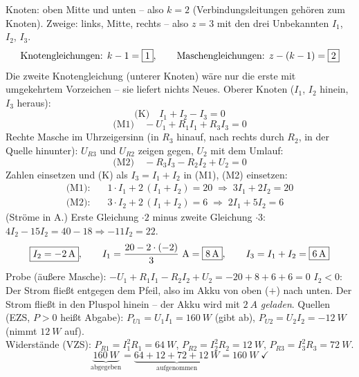 \documentclass[11pt,a4paper]{article}
\begin{document}
\begin{loesung}
Knoten: oben Mitte und unten -- also $k = 2$ (Verbindungsleitungen gehören zum Knoten). Zweige: links, Mitte, rechts -- also $z = 3$ mit den drei Unbekannten $I_1$, $I_2$, $I_3$.
\[
  \text{Knotengleichungen: } k - 1 = \ergebnis{1}, \qquad \text{Maschengleichungen: } z - (k-1) = \ergebnis{2}
\]
Die zweite Knotengleichung (unterer Knoten) wäre nur die erste mit umgekehrtem Vorzeichen -- sie liefert nichts Neues.
Oberer Knoten ($I_1$, $I_2$ hinein, $I_3$ heraus):
\[
  \text{(K)}\quad I_1 + I_2 - I_3 = 0
\]
\[
  \text{(M1)}\quad -U_1 + R_1 I_1 + R_3 I_3 = 0
\]
Rechte Masche im Uhrzeigersinn (in $R_3$ hinauf, nach rechts durch $R_2$, in der Quelle hinunter): $U_{R3}$ und $U_{R2}$ zeigen gegen, $U_2$ mit dem Umlauf:
\[
  \text{(M2)}\quad -R_3 I_3 - R_2 I_2 + U_2 = 0
\]
Zahlen einsetzen und (K) als $I_3 = I_1 + I_2$ in (M1), (M2) einsetzen:
\begin{align*}
  \text{(M1)}:\quad & 1\cdot I_1 + 2\,(I_1 + I_2) = 20 \;\Rightarrow\; 3I_1 + 2I_2 = 20\\
  \text{(M2)}:\quad & 3\cdot I_2 + 2\,(I_1 + I_2) = 6 \;\Rightarrow\; 2I_1 + 5I_2 = 6
\end{align*}
(Ströme in A.) Erste Gleichung $\cdot 2$ minus zweite Gleichung $\cdot 3$: $4I_2 - 15 I_2 = 40 - 18 \Rightarrow -11 I_2 = 22$.
\[
  \ergebnis{I_2 = \SI{-2}{A}}, \qquad I_1 = \frac{20 - 2\cdot(-2)}{3}\ \si{A} = \ergebnis{\SI{8}{A}}, \qquad I_3 = I_1 + I_2 = \ergebnis{\SI{6}{A}}
\]
Probe (äußere Masche): $-U_1 + R_1 I_1 - R_2 I_2 + U_2 = -20 + 8 + 6 + 6 = 0$ \checkmark
{}
$I_2 < 0$: Der Strom fließt entgegen dem Pfeil, also im Akku von oben ($+$) nach unten. Der Strom fließt in den Pluspol hinein -- der Akku wird mit $\SI{2}{A}$ \emph{geladen}.
Quellen (EZS, $P > 0$ heißt Abgabe): $P_{U1} = U_1 I_1 = \SI{160}{W}$ (gibt ab), $P_{U2} = U_2 I_2 = \SI{-12}{W}$ (nimmt $\SI{12}{W}$ auf).\\
Widerstände (VZS): $P_{R1} = I_1^2 R_1 = \SI{64}{W}$, $P_{R2} = I_2^2 R_2 = \SI{12}{W}$, $P_{R3} = I_3^2 R_3 = \SI{72}{W}$.
\[
  \underbrace{\SI{160}{W}}_\text{abgegeben} = \underbrace{64 + 12 + 72 + 12\ \si{W}}_\text{aufgenommen} = \SI{160}{W} \;\checkmark
\]
\end{loesung}
\end{document}
